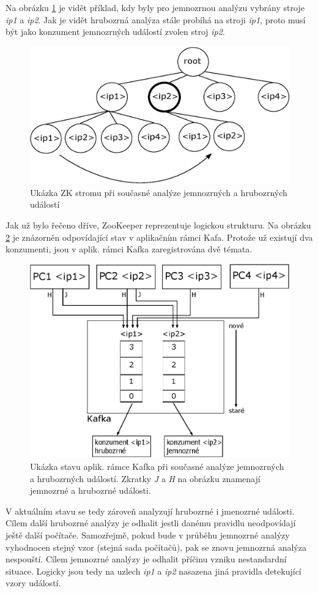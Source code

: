\documentclass[
  digital, %
  table,   %
  nolof,     %
  nolot,     %
  oneside, %
  nocover,
  monochrome,
  12pt
]{fithesis3}
\begin{document}
Na obrázku \ref{fig:zookeeper-state-1} je vidět příklad, kdy byly pro jemnozrnou analýzu vybrány stroje \textit{ip1} a  \textit{ip2}. Jak je vidět hrubozrná analýza stále probíhá na stroji \textit{ip1}, proto musí být jako konzument jemnozrných událostí zvolen stroj \textit{ip2}.

\begin{figure}[H]
	\centering
    \includegraphics[width=.6\linewidth, height=.2\textheight]{images/zookeeper-state-1.eps}
    \caption{Ukázka ZK stromu při současné analýze jemnozrných a hrubozrných událostí}
    \label{fig:zookeeper-state-1}
\end{figure}

Jak už bylo řečeno dříve, ZooKeeper reprezentuje logickou strukturu. Na obrázku \ref{fig:kafka-state-1} je znázorněn odpovídající stav v aplikačním rámci Kafa. Protože už existují dva konzumenti, jsou v aplik. rámci Kafka zaregistrována dvě témata.

\begin{figure}[H]
	\centering
    \includegraphics[width=.5\linewidth, height=.3\textheight]{images/kafka-state-1.eps}
    \caption{Ukázka stavu aplik. rámce Kafka při současné analýze jemnozrných a hrubozrných událostí. Zkratky \textit{J} a \textit{H} na obrázku znamenají jemnozrné a hrubozrné události.}
    \label{fig:kafka-state-1}
\end{figure}

V aktuálním stavu se tedy zároveň analyzují hrubozrné i jmenozrné události. Cílem další hrubozrné analýzy je odhalit jestli danému pravidlu neodpovídají ještě další počítače. Samozřejmě, pokud bude v průběhu jemnozrné analýzy vyhodnocen stejný vzor (stejná sada počítačů), pak se znovu jemnozrná analýza nespouští. Cílem jemnozrné analýzy je odhalit příčinu vzniku nestandardní situace. Logicky jsou tedy na uzlech \textit{ip1} a  \textit{ip2} nasazena jiná pravidla detekující vzory událostí.
\end{document}
